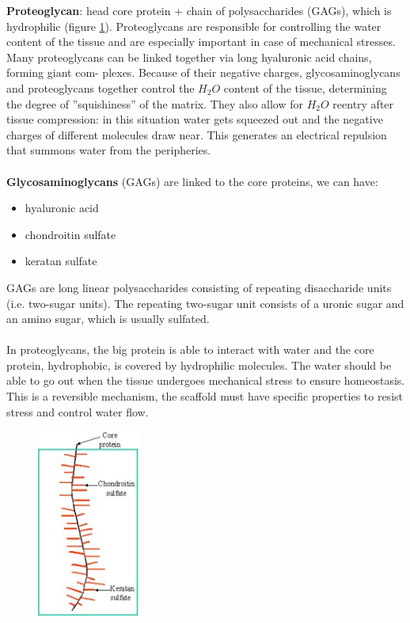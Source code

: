 \textbf{Proteoglycan}: head core protein + chain of polysaccharides (GAGs), which is hydrophilic (figure \ref{fig:pgag}).
Proteoglycans are responsible for controlling the water content of the tissue and are especially important in case of mechanical stresses.
Many proteoglycans can be linked together via long hyaluronic acid chains, forming giant com- plexes.
Because of their negative charges, glycosaminoglycans and proteoglycans together control the $H_2O$ content of the tissue, determining the degree of ”squishiness” of the matrix.
They also allow for $H_2O$ reentry after tissue compression: in this situation water gets squeezed out and the negative charges of different molecules draw near.
This generates an electrical repulsion that summons water from the peripheries.
\\
\\
\noindent
\textbf{Glycosaminoglycans} (GAGs) are linked to the core proteins, we can have:
\begin{itemize}
\item hyaluronic acid
\item chondroitin sulfate
\item keratan sulfate
\end{itemize}
\noindent
GAGs are long linear polysaccharides consisting of repeating disaccharide units (i.e. two-sugar units).
The repeating two-sugar unit consists of a uronic sugar and an amino sugar, which is usually sulfated.
\\
\\
\noindent
In proteoglycans, the big protein is able to interact with water and the core protein, hydrophobic, is covered by hydrophilic molecules.
The water should be able to go out when the tissue undergoes mechanical stress to ensure homeostasis.
This is a reversible mechanism,  the scaffold must have specific properties to resist stress and control water flow.
\begin{figure}[ht]
\centering
\includegraphics[width=0.3\textwidth]{pgag}
\caption{\label{fig:pgag}}
\end{figure}

